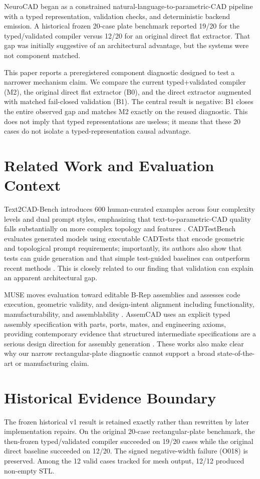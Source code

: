 \documentclass[10pt]{article}
\begin{document}
NeuroCAD began as a constrained natural-language-to-parametric-CAD pipeline with a typed representation, validation checks, and deterministic backend emission. A historical frozen 20-case plate benchmark reported 19/20 for the typed/validated compiler versus 12/20 for an original direct flat extractor. That gap was initially suggestive of an architectural advantage, but the systems were not component matched.

This paper reports a preregistered component diagnostic designed to test a narrower mechanism claim. We compare the current typed+validated compiler (M2), the original direct flat extractor (B0), and the direct extractor augmented with matched fail-closed validation (B1). The central result is negative: B1 closes the entire observed gap and matches M2 exactly on the reused diagnostic. This does not imply that typed representations are useless; it means that these 20 cases do not isolate a typed-representation causal advantage.

\section{Related Work and Evaluation Context}
Text2CAD-Bench introduces 600 human-curated examples across four complexity levels and dual prompt styles, emphasizing that text-to-parametric-CAD quality falls substantially on more complex topology and features \cite{wang2026text2cadbench}. CADTestBench evaluates generated models using executable CADTests that encode geometric and topological prompt requirements; importantly, its authors also show that tests can guide generation and that simple test-guided baselines can outperform recent methods \cite{mallis2026cadtests}. This is closely related to our finding that validation can explain an apparent architectural gap.

MUSE moves evaluation toward editable B-Rep assemblies and assesses code execution, geometric validity, and design-intent alignment including functionality, manufacturability, and assemblability \cite{dong2026muse}. AssemCAD uses an explicit typed assembly specification with parts, ports, mates, and engineering axioms, providing contemporary evidence that structured intermediate specifications are a serious design direction for assembly generation \cite{dong2026assemcad}. These works also make clear why our narrow rectangular-plate diagnostic cannot support a broad state-of-the-art or manufacturing claim.

\section{Historical Evidence Boundary}
The frozen historical v1 result is retained exactly rather than rewritten by later implementation repairs. On the original 20-case rectangular-plate benchmark, the then-frozen typed/validated compiler succeeded on 19/20 cases while the original direct baseline succeeded on 12/20. The signed negative-width failure (O018) is preserved. Among the 12 valid cases tracked for mesh output, 12/12 produced non-empty STL.
\end{document}
